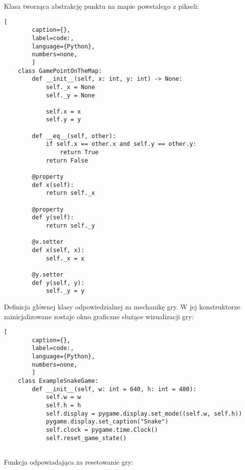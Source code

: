\clearpage

Klasa tworząca abstrakcję punktu na mapie powstałego z pikseli:

\begin{onepage}
    \begin{lstlisting}[
        caption={},
        label=code:,
        language={Python},
        numbers=none,
        ]
    class GamePointOnTheMap:
        def __init__(self, x: int, y: int) -> None:
            self._x = None
            self._y = None
    
            self.x = x
            self.y = y
    
        def __eq__(self, other):
            if self.x == other.x and self.y == other.y:
                return True
            return False
    
        @property
        def x(self):
            return self._x
    
        @property
        def y(self):
            return self._y
    
        @x.setter
        def x(self, x):
            self._x = x
    
        @y.setter
        def y(self, y):
            self._y = y
    \end{lstlisting}
\end{onepage}

Definicja głównej klasy odpowiedzialnej za mechanikę gry. W jej konstruktorze zainicjalizowane zostaje okno graficzne służące wizualizacji gry:

\begin{onepage}
    \begin{lstlisting}[
        caption={},
        label=code:,
        language={Python},
        numbers=none,
        ]
    class ExampleSnakeGame:
        def __init__(self, w: int = 640, h: int = 480):
            self.w = w
            self.h = h
            self.display = pygame.display.set_mode((self.w, self.h))
            pygame.display.set_caption("Snake")
            self.clock = pygame.time.Clock()
            self.reset_game_state()
    
    \end{lstlisting}
\end{onepage}

\clearpage

Funkcja odpowiadająca za resetowanie gry:

